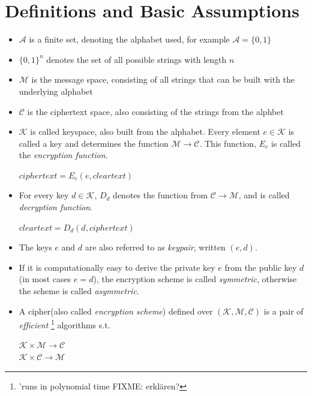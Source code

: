  
\section{Definitions and Basic Assumptions}

\begin{itemize}
 \item $\mathcal{A}$ is a finite set, denoting the alphabet used, for example
 $\mathcal{A} = \{0, 1\}$
 \item $\{0, 1\}^n$ denotes the set of all possible strings with length $n$
 \item $\mathcal{M}$ is the message space, consisting of all strings that can be built with the 
 underlying alphabet
 \item $\mathcal{C}$ is the ciphertext space, also consisting of the strings from 
 the alphbet
 \item $\mathcal{K}$ is called keyspace, also built from the alphabet. Every element
 $e \in \mathcal{K}$ is called a key and determines the function $\mathcal{M} \rightarrow \mathcal{C}$.
 This function, $E_e$ is called the \textit{encryption function}. 
  \begin{center}
 $ciphertext = E_e(e, cleartext)$
  \end{center}

 \item For every key $d \in \mathcal{K}$, $D_d$ denotes the function from $\mathcal{C} \rightarrow
  \mathcal{M}$, and is called \textit{decryption function}.
  \begin{center}
  $cleartext  = D_d(d, ciphertext)$
    \end{center}
 \item The keys $e$ and $d$ are also referred to as \textit{keypair}, written $(e,d)$. 
 
 \item If it is computationally easy to derive the private key $e$ from the public key $d$(in most cases $e = d$), the encryption scheme
 is called \textit{symmetric}, otherwise the scheme is called \textit{asymmetric}.
 \item A cipher(also called \textit{encryption scheme}) defined over $\mathcal{(K,M,C)}$ is a pair of \textit{efficient}
 \footnote{'runs in polynomial time   FIXME: erklären?} algorithms s.t.
 \begin{center}
   $\mathcal{K} \times \mathcal{M} \rightarrow \mathcal{C}$
   \\
   $\mathcal{K} \times \mathcal{C} \rightarrow \mathcal{M}$
 

\end{center}
\end{itemize}
